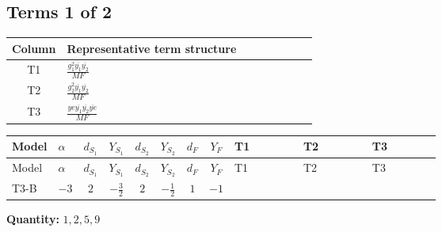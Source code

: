 \documentclass[8pt]{article}
\begin{document}
\begin{landscape}
\subsection*{Terms 1 of 2}
\begin{center}
\begin{tabular}{@{}c >{\raggedright\arraybackslash}p{0.82\linewidth}@{}}
\toprule
Column & Representative term structure \\
\midrule
T1 & \(\displaystyle \frac{g_{1}^{2} \overline{y_{1}} \overline{y_{2}}}{MF}\) \\
\midrule
T2 & \(\displaystyle \frac{g_{2}^{2} \overline{y_{1}} \overline{y_{2}}}{MF}\) \\
\midrule
T3 & \(\displaystyle \frac{ye \overline{y_{1}} \overline{y_{2}} \overline{ye}}{MF}\) \\
\midrule
\bottomrule
\end{tabular}
\end{center}
\smallskip
\tiny
\begin{longtable}{@{}llcccccc >{\raggedright\arraybackslash}p{0.21\linewidth} >{\raggedright\arraybackslash}p{0.21\linewidth} >{\raggedright\arraybackslash}p{0.21\linewidth}@{}}
\toprule
Model & $\alpha$ & $d_{S_1}$ & $Y_{S_1}$ & $d_{S_2}$ & $Y_{S_2}$ & $d_F$ & $Y_F$ & T1 & T2 & T3 \\
\midrule
\endfirsthead
\toprule
Model & $\alpha$ & $d_{S_1}$ & $Y_{S_1}$ & $d_{S_2}$ & $Y_{S_2}$ & $d_F$ & $Y_F$ & T1 & T2 & T3 \\
\midrule
\endhead
T3-B & $-3$ & $2$ & $-\frac{3}{2}$ & $2$ & $-\frac{1}{2}$ & $1$ & $-1$ & \scriptsize\adjustbox{max width=\linewidth}{$\begin{gathered} \frac{3 g_{1}^{2} \overline{y_{1}} \overline{y_{2}}}{4 MF}\end{gathered}$} & \scriptsize\adjustbox{max width=\linewidth}{$\begin{gathered} \frac{3 g_{2}^{2} \overline{y_{1}} \overline{y_{2}}}{8 MF}\end{gathered}$} & \scriptsize\adjustbox{max width=\linewidth}{$\begin{gathered} - \frac{ye \overline{y_{1}} \overline{y_{2}} \overline{ye}}{8 MF}\end{gathered}$} \\
\midrule
\bottomrule
\end{longtable}
\clearpage
\noindent\textbf{Quantity: }$\mathrm{1,2,5,9}$\par\smallskip

\end{landscape}
\end{document}
